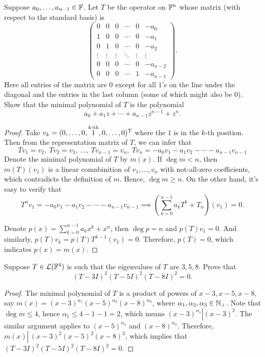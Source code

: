 \documentclass{article}
\begin{document}
\begin{problem}[5B-16]
Suppose $a_0, \ldots, a_{n-1} \in \mathbb{F}$. Let $T$ be the operator on $\mathbb{F}^n$ whose matrix (with respect to the standard basis) is
\[
\begin{pmatrix}
0 & 0 & 0 & \cdots & 0 & -a_0 \\
1 & 0 & 0 & \cdots & 0 & -a_1 \\
0 & 1 & 0 & \cdots & 0 & -a_2 \\
\vdots & \vdots & \vdots & \ddots & \vdots & \vdots \\
0 & 0 & 0 & \cdots & 0 & -a_{n-2} \\
0 & 0 & 0 & \cdots & 1 & -a_{n-1}
\end{pmatrix}.
\]
Here all entries of the matrix are $0$ except for all $1$'s on the line under the diagonal and the entries in the last column (some of which might also be $0$). Show that the minimal polynomial of $T$ is the polynomial
\[
a_0 + a_1 z + \cdots + a_{n-1}z^{n-1} + z^n.
\]
\end{problem}

\begin{proof}
  Take \( v_k=(0,\dots,0,\overset{k \text{-th}}{1},0,\dots,0)^\mathrm{T} \) where the $1$ is in the $k$-th position. Then from the representation matrix of \( T \), we can infer that
  \[ Tv_1=v_2, \  Tv_2=v_3, \  \ldots, \  Tv_{n-1}=v_n, \  Tv_n=-a_0v_1-a_1v_2-\cdots-a_{n-1}v_{n-1} \]
  Denote the minimal polynomial of \( T \) by \( m(x) \). If \( \deg m<n \), then \( m(T)(v_1) \) is a linear comnbinition of \( v_1,\dots,v_{n} \) with not-all-zero coefficients, which contradicts the definition of \( m \). Hence, \( \deg m\ge n \). On the other hand, it's easy to verify that
  \[ T^n v_1=-a_0v_1-a_1v_2-\cdots-a_{n-1}v_{n-1}\implies \left( \sum_{k=0}^{n-1}a_kT^k+T_n \right)(v_1)=0. \]\par
  Denote \( p(x)=\sum_{k=0}^{n-1}a_kx^k+x^n \), then \( \deg p=n \) and \( p(T)v_1=0 \). And similarly, \( p(T)v_k=p(T)T^{k-1}(v_1)=0 \). Therefore, \( p(T)=0 \), which indicates \( p(x)=m(x) \).
\end{proof}



\begin{problem}[5B-20]
Suppose $T \in \mathcal{L}(\mathbb{F}^4)$ is such that the eigenvalues of $T$ are $3, 5, 8$. Prove that
\[
(T-3I)^2(T-5I)^2(T-8I)^2=0.
\]
\end{problem}

\begin{proof}
  The minimal polynomial of \( T \) is a product of powers of \( x-3, x-5, x-8 \), say \( m(x)=(x-3)^{\alpha_1}(x-5)^{\alpha_2}(x-8)^{\alpha_3} \), where \( \alpha_1,\alpha_2,\alpha_3\in\mathbb{N}_+ \). Note that \( \deg m\le 4 \), hence \( \alpha_1\le 4-1-1=2 \), which means \( (x-3)^{\alpha_1}\left|(x-3)^2\right. \). The similar argument applies to \( (x-5)^{\alpha_2} \) and \( (x-8)^{\alpha_3} \). Therefore, \( m(x)\left|\,(x-3)^2(x-5)^2(x-8)^2\right. \), which implies that \( (T-3I)^2(T-5I)^2(T-8I)^2=0 \).
\end{proof}
\end{document}
